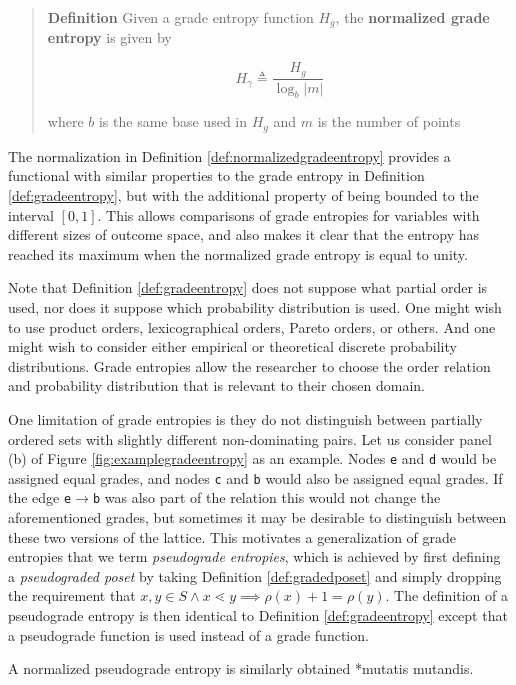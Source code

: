 \documentclass[
  letterpaper,
  DIV=11,
  numbers=noendperiod]{scrreprt}
\begin{document}
\begin{quote}
\textbf{Definition} Given a grade entropy function \(H_g\), the
\textbf{normalized grade entropy} is given by

\[H_{\gamma} \triangleq \frac{H_g}{\log_b |m|}\]

where \(b\) is the same base used in \(H_g\) and \(m\) is the number of
points
\end{quote}

The normalization in Definition \ref{def:normalizedgradeentropy}
provides a functional with similar properties to the grade entropy in
Definition \ref{def:gradeentropy}, but with the additional property of
being bounded to the interval \([0,1]\). This allows comparisons of
grade entropies for variables with different sizes of outcome space, and
also makes it clear that the entropy has reached its maximum when the
normalized grade entropy is equal to unity.

Note that Definition \ref{def:gradeentropy} does not suppose what
partial order is used, nor does it suppose which probability
distribution is used. One might wish to use product orders,
lexicographical orders, Pareto orders, or others. And one might wish to
consider either empirical or theoretical discrete probability
distributions. Grade entropies allow the researcher to choose the order
relation and probability distribution that is relevant to their chosen
domain.

One limitation of grade entropies is they do not distinguish between
partially ordered sets with slightly different non-dominating pairs. Let
us consider panel (b) of Figure \ref{fig:examplegradeentropy} as an
example. Nodes \texttt{e} and \texttt{d} would be assigned equal grades,
and nodes \texttt{c} and \texttt{b} would also be assigned equal grades.
If the edge \texttt{e}\(\rightarrow\)\texttt{b} was also part of the
relation this would not change the aforementioned grades, but sometimes
it may be desirable to distinguish between these two versions of the
lattice. This motivates a generalization of grade entropies that we term
\textit{pseudograde entropies}, which is achieved by first defining a
\emph{pseudograded poset} by taking Definition \ref{def:gradedposet} and
simply dropping the requirement that
\(x,y \in S \land x \lessdot y \implies \rho(x) + 1 = \rho(y)\). The
definition of a pseudograde entropy is then identical to Definition
\ref{def:gradeentropy} except that a pseudograde function is used
instead of a grade function.

\begin{tcolorbox}[enhanced jigsaw, colbacktitle=quarto-callout-note-color!10!white, bottomrule=.15mm, left=2mm, arc=.35mm, bottomtitle=1mm, coltitle=black, breakable, rightrule=.15mm, toptitle=1mm, opacityback=0, titlerule=0mm, title=\textcolor{quarto-callout-note-color}{\faInfo}\hspace{0.5em}{Note}, colframe=quarto-callout-note-color-frame, toprule=.15mm, leftrule=.75mm, opacitybacktitle=0.6, colback=white]

A normalized pseudograde entropy is similarly obtained *mutatis
mutandis.

\end{tcolorbox}
\end{document}
